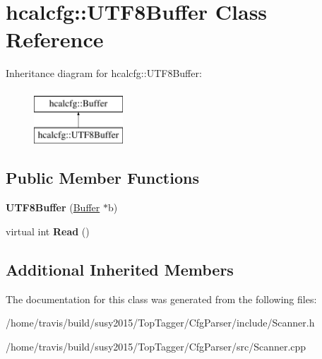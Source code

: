 \hypertarget{classhcalcfg_1_1UTF8Buffer}{\section{hcalcfg\-:\-:U\-T\-F8\-Buffer Class Reference}
\label{classhcalcfg_1_1UTF8Buffer}
}
Inheritance diagram for hcalcfg\-:\-:U\-T\-F8\-Buffer\-:\begin{figure}[H]
\begin{center}
\leavevmode
\includegraphics[height=2.000000cm]{classhcalcfg_1_1UTF8Buffer}
\end{center}
\end{figure}
\subsection*{Public Member Functions}
\begin{DoxyCompactItemize}
\item 
\hypertarget{classhcalcfg_1_1UTF8Buffer_aa202be6b47eeb2471d0eda588f1293ce}{{\bfseries U\-T\-F8\-Buffer} (\hyperlink{classhcalcfg_1_1Buffer}{Buffer} $\ast$b)}\label{classhcalcfg_1_1UTF8Buffer_aa202be6b47eeb2471d0eda588f1293ce}

\item 
\hypertarget{classhcalcfg_1_1UTF8Buffer_a14144ddafb52089c447cf50c89ae4466}{virtual int {\bfseries Read} ()}\label{classhcalcfg_1_1UTF8Buffer_a14144ddafb52089c447cf50c89ae4466}

\end{DoxyCompactItemize}
\subsection*{Additional Inherited Members}


The documentation for this class was generated from the following files\-:\begin{DoxyCompactItemize}
\item 
/home/travis/build/susy2015/\-Top\-Tagger/\-Cfg\-Parser/include/Scanner.\-h\item 
/home/travis/build/susy2015/\-Top\-Tagger/\-Cfg\-Parser/src/Scanner.\-cpp\end{DoxyCompactItemize}
